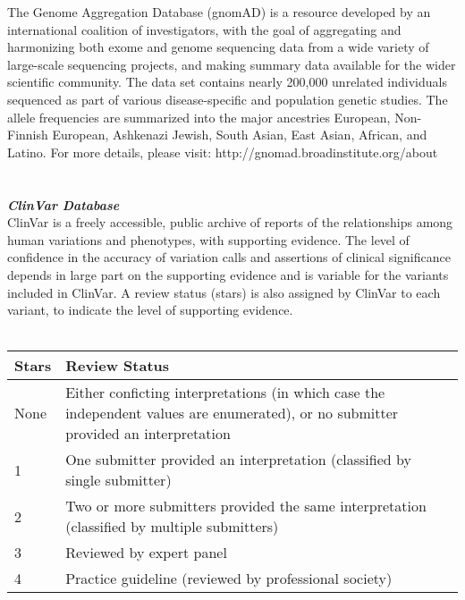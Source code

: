 The Genome Aggregation Database (gnomAD) is a resource developed by an international coalition of investigators, with the goal of aggregating and harmonizing both exome and genome sequencing data from a wide variety of large-scale sequencing projects, and making summary data available for the wider scientific community. The data set contains nearly 200,000 unrelated individuals sequenced as part of various disease-specific and population genetic studies. The allele frequencies are summarized into the major ancestries European, Non-Finnish European, Ashkenazi Jewish,  South Asian, East Asian, African, and Latino. For more details, please visit: http://gnomad.broadinstitute.org/about
\\ \\ \\

\newpage
{\large \textbf{\textit{ClinVar Database}}}
\\
ClinVar is a freely accessible, public archive of reports of the relationships among human variations and phenotypes, with supporting evidence. The level of confidence in the accuracy of variation calls and assertions of clinical significance depends in large part on the supporting evidence and is variable for the variants included in ClinVar. A review status (stars) is also assigned by ClinVar to each variant, to indicate the level of supporting evidence. 
\\ \\

\begin{small}
\begin{tabular}{ |p{1cm}|p{15cm}|  }
\hline
\textbf{Stars} & \textbf{Review Status} \\
\hline
None & Either conficting interpretations (in which case the independent values are enumerated), or no submitter provided an interpretation \\
1 & One submitter provided an interpretation (classified by single submitter) \\
2 & Two or more submitters provided the same interpretation (classified by multiple submitters) \\
3 & Reviewed by expert panel \\
4 & Practice guideline (reviewed by professional society) \\
\hline
\end{tabular}
\end{small}
\\ \\ \\

